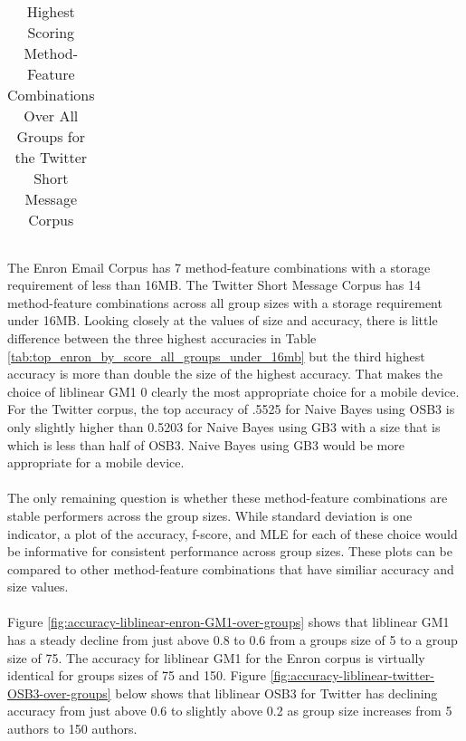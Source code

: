 \begin{table}[htbp!]
\begin{center}
\begin{tabular}{ | r | r | r | r | r | r | r | r| r | }
\end{tabular}
		\caption{Highest Scoring Method-Feature Combinations Over All Groups for the Twitter Short Message Corpus}
		\label{tab:top_twitter_by_score_all_groups_under_16mb}
	\end{center}
\end{table}

\paragraph*{} The Enron Email Corpus has 7 method-feature combinations with a storage requirement of less than 16MB. The Twitter Short Message Corpus has 14 method-feature combinations across all group sizes with a storage requirement under 16MB.  Looking closely at the values of size and accuracy, there is little difference between the three highest accuracies in Table \ref{tab:top_enron_by_score_all_groups_under_16mb} but the third highest accuracy is more than double the size of the highest accuracy.  That makes the choice of liblinear GM1 0 clearly the most appropriate choice for a mobile device. For the Twitter corpus, the top accuracy of .5525 for Naive Bayes using OSB3 is only slightly higher than 0.5203 for Naive Bayes using GB3 with a size that is which is less than half of OSB3.  Naive Bayes using GB3 would be more appropriate for a mobile device.

\paragraph*{} The only remaining question is whether these method-feature combinations are stable performers across the group sizes.  While standard deviation is one indicator, a plot of the accuracy, f-score, and MLE for each of these choice would be informative for consistent performance across group sizes.  These plots can be compared to other method-feature combinations that have similiar accuracy and size values.

\paragraph*{} Figure \ref{fig:accuracy-liblinear-enron-GM1-over-groups} shows that liblinear GM1 has a steady decline from just above 0.8 to 0.6 from a groups size of 5 to a group size of 75.  The accuracy for liblinear GM1 for the Enron corpus is virtually identical for groups sizes of 75 and 150. Figure \ref{fig:accuracy-liblinear-twitter-OSB3-over-groups} below shows that liblinear OSB3 for Twitter has declining accuracy from just above 0.6 to slightly above 0.2 as group size increases from 5 authors to 150 authors.  

